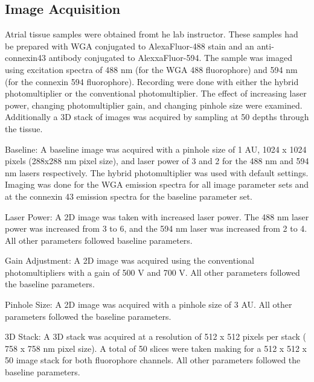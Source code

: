 \documentclass[12pt]{article}
\begin{document}
\subsection{Image Acquisition}
Atrial tissue samples were obtained fromt he lab instructor. These samples had be prepared with WGA conjugated to AlexaFluor-488 stain and an anti-connexin43 antibody conjugated to AlexxaFluor-594. The sample was imaged using excitation spectra of 488 nm (for the WGA 488 fluorophore) and 594 nm (for the connexin 594 fluorophore). Recording were done with either the hybrid photomultiplier or the conventional photomultiplier. The effect of increasing laser power, changing photomultiplier gain, and changing pinhole size were examined. Additionally a 3D stack of images was acquired by sampling at 50 depths through the tissue.
\par{Baseline:} A baseline image was acquired with a pinhole size of 1 AU, 1024 x 1024 pixels (288x288 nm pixel size), and laser power of 3 and 2 for the 488 nm and 594 nm lasers respectively. The hybrid photomultiplier was used with default settings. Imaging was done for the WGA emission spectra for all image parameter sets and at the connexin 43 emission spectra for the baseline parameter set.
\par{Laser Power:} A 2D image was taken with increased laser power. The 488 nm laser power was increased from 3 to 6, and the 594 nm laser was increased from 2 to 4. All other parameters followed baseline parameters.
\par{Gain Adjustment:} A 2D image was acquired using the conventional photomultipliers with a gain of 500 V and 700 V. All other parameters followed the baseline parameters.
\par{Pinhole Size:} A 2D image was acquired with a pinhole size of 3 AU. All other parameters followed the baseline parameters.
\par{3D Stack: } A 3D stack was acquired at a resolution of 512 x 512 pixels per stack ( 758 x 758 nm pixel size). A total of 50 slices were taken making for a 512 x 512 x 50 image stack for both fluorophore channels. All other parameters followed the baseline parameters.
\end{document}
